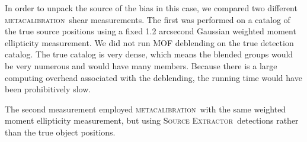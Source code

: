 \documentclass[iop, twocolappendix, appendixfloats, numberedappendix, apj]{hackemulateapj}
\newcommand{\mcal}{\textsc{metacalibration}}
\newcommand{\sx}{\textsc{Source Extractor}}
\begin{document}






In order to unpack the source of the bias in this case, we compared two
different \mcal\ shear measurements. The first was performed on a catalog of
the true source positions using a fixed 1.2 arcsecond Gaussian weighted moment
ellipticity measurement. We did not run MOF deblending on the true detection
catalog.  The true catalog is very dense, which means the blended groups would
be very numerous and would have many members.  Because there is a large
computing overhead associated with the deblending, the running time would have
been prohibitively slow.

The second measurement employed \mcal\ with the same weighted moment
ellipticity measurement, but using \sx\ detections rather than the true object
positions.
\end{document}
